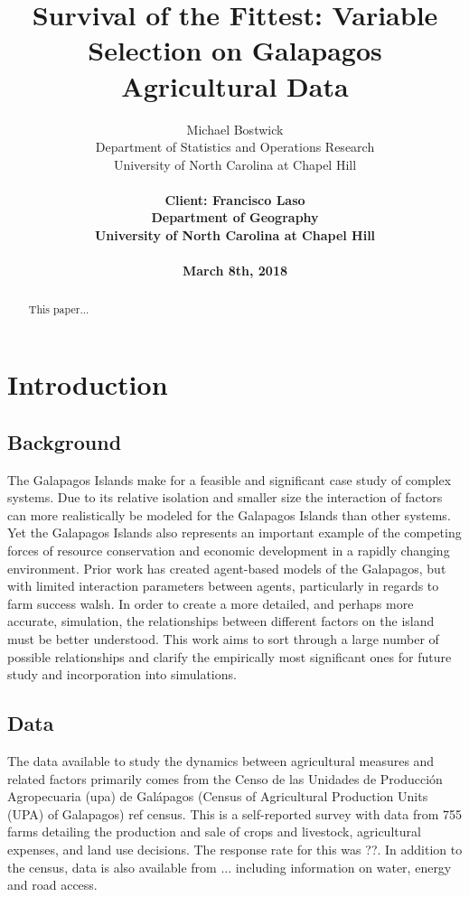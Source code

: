 \documentclass{article}
\title{Survival of the Fittest: Variable Selection on Galapagos Agricultural Data}
\author{
  Michael Bostwick\\
  Department of Statistics and Operations Research\\
  University of North Carolina at Chapel Hill\\
	\\
  \bf{Client: Francisco Laso} \\
  Department of Geography \\
  University of North Carolina at Chapel Hill\\
  \\
  March 8th, 2018 \\
}
\begin{document}
\maketitle
\begin{abstract}
  This paper...
  
  \end{abstract}

\section{Introduction}

\subsection{Background}

The Galapagos Islands make for a feasible and significant case study of complex systems. Due to its relative isolation and smaller size the interaction of factors can more realistically be modeled for the Galapagos Islands than other systems. Yet the Galapagos Islands also represents an important example of the competing forces of resource conservation and economic development in a rapidly changing environment. Prior work has created agent-based models of the Galapagos, but with limited interaction parameters between agents, particularly in regards to farm success walsh. In order to create a more detailed, and perhaps more accurate, simulation, the relationships between different factors on the island must be better understood. This work aims to sort through a large number of possible relationships and clarify the empirically most significant ones for future study and incorporation into simulations. 

\subsection{Data}

The data available to study the dynamics between agricultural measures and related factors primarily 
comes from the Censo de las Unidades de Producci\'on Agropecuaria (upa) de Gal\'apagos (Census of Agricultural Production 
Units (UPA) of Galapagos) ref census. This is a self-reported survey with data from 755 
farms detailing the production and sale of crops and livestock, agricultural expenses, and land use 
decisions. The response rate for this was ??. In addition to the census, data is also available from ... including information on water, energy and road access.
\end{document}
